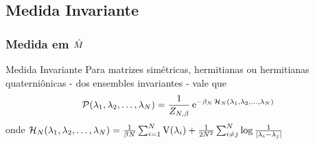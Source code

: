 
\subsection{Medida Invariante}

\begin{frame}
	\frametitle{Medida em $\hat M$}

		\begin{block}{Medida Invariante}
			Para matrizes simétricas, hermitianas ou hermitianas quaterniônicas - dos ensembles invariantes - vale que
			\begin{equation*}
					\mathcal{P}{(\lambda_1, \lambda_2, \dots, \lambda_N)} = \frac{1}{Z_{N, \beta}} \operatorname{e}^{-\beta_N \operatorname{\mathcal{H}}_N(\lambda_1, \lambda_2, \dots, \lambda_N)}
			\end{equation*}
				onde
				$\operatorname{\mathcal{H}}_N(\lambda_1, \lambda_2, \dots, \lambda_N) = \frac{1}{\beta N} \sum_{i=1}^N \operatorname{V}(\lambda_i) + \frac{1}{2N^2} \sum_{i \neq j}^{N}  \log \frac{1}{|\lambda_i - \lambda_j|}$
		\end{block}
	
\end{frame}



